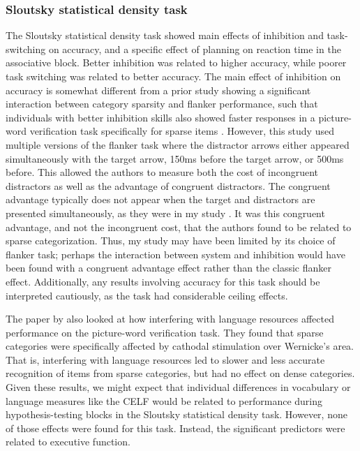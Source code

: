 \documentclass[../dissertation.tex]{subfiles}
\begin{document}
\subsubsection{Sloutsky statistical density task}
	The Sloutsky statistical density task showed main effects of inhibition and task-switching on accuracy, and a specific effect of planning on reaction time in the associative block. Better inhibition was related to higher accuracy, while poorer task switching was related to better accuracy. The main effect of inhibition on accuracy is somewhat different from a prior study showing a significant interaction between category sparsity and flanker performance, such that individuals with better inhibition skills also showed faster responses in a picture-word verification task specifically for sparse items \citep{Perry2016}. However, this study used multiple versions of the flanker task where the distractor arrows either appeared simultaneously with the target arrow, 150ms before the target arrow, or 500ms before. This allowed the authors to measure both the cost of incongruent distractors as well as the advantage of congruent distractors. The congruent advantage typically does not appear when the target and distractors are presented simultaneously, as they were in my study \citep{Botella2002}. It was this congruent advantage, and not the incongruent cost, that the authors found to be related to sparse categorization. Thus, my study may have been limited by its choice of flanker task; perhaps the interaction between system and inhibition would have been found with a congruent advantage effect rather than the classic flanker effect. Additionally, any results involving accuracy for this task should be interpreted cautiously, as the task had considerable ceiling effects. \par 
	The paper by \citet{Perry2016} also looked at how interfering with language resources affected performance on the picture-word verification task. They found that sparse categories were specifically affected by cathodal stimulation over Wernicke's area. That is, interfering with language resources led to slower and less accurate recognition of items from sparse categories, but had no effect on dense categories. Given these results, we might expect that individual differences in vocabulary or language measures like the CELF would be related to performance during hypothesis-testing blocks in the Sloutsky statistical density task. However, none of those effects were found for this task. Instead, the significant predictors were related to executive function. \par 
\end{document}
